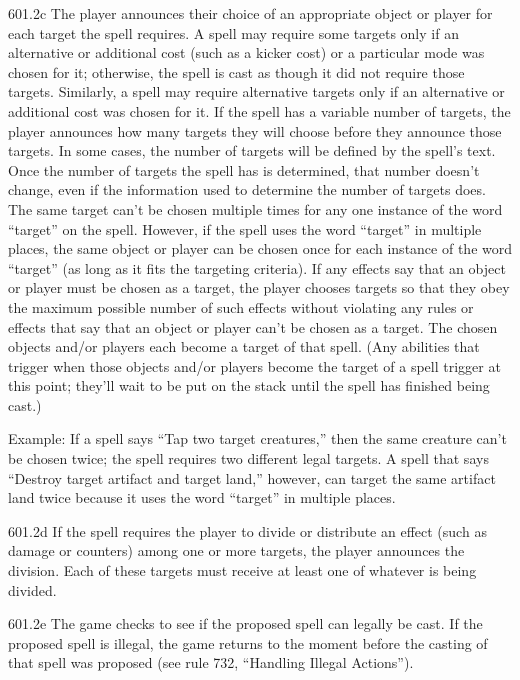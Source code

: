 601.2c The player announces their choice of an appropriate object or player for each target the spell requires. A spell may require some targets only if an alternative or additional cost (such as a kicker cost) or a particular mode was chosen for it; otherwise, the spell is cast as though it did not require those targets. Similarly, a spell may require alternative targets only if an alternative or additional cost was chosen for it. If the spell has a variable number of targets, the player announces how many targets they will choose before they announce those targets. In some cases, the number of targets will be defined by the spell’s text. Once the number of targets the spell has is determined, that number doesn’t change, even if the information used to determine the number of targets does. The same target can’t be chosen multiple times for any one instance of the word “target” on the spell. However, if the spell uses the word “target” in multiple places, the same object or player can be chosen once for each instance of the word “target” (as long as it fits the targeting criteria). If any effects say that an object or player must be chosen as a target, the player chooses targets so that they obey the maximum possible number of such effects without violating any rules or effects that say that an object or player can’t be chosen as a target. The chosen objects and/or players each become a target of that spell. (Any abilities that trigger when those objects and/or players become the target of a spell trigger at this point; they’ll wait to be put on the stack until the spell has finished being cast.)

Example: If a spell says “Tap two target creatures,” then the same creature can’t be chosen twice; the spell requires two different legal targets. A spell that says “Destroy target artifact and target land,” however, can target the same artifact land twice because it uses the word “target” in multiple places.

601.2d If the spell requires the player to divide or distribute an effect (such as damage or counters) among one or more targets, the player announces the division. Each of these targets must receive at least one of whatever is being divided.

601.2e The game checks to see if the proposed spell can legally be cast. If the proposed spell is illegal, the game returns to the moment before the casting of that spell was proposed (see rule 732, “Handling Illegal Actions”).

